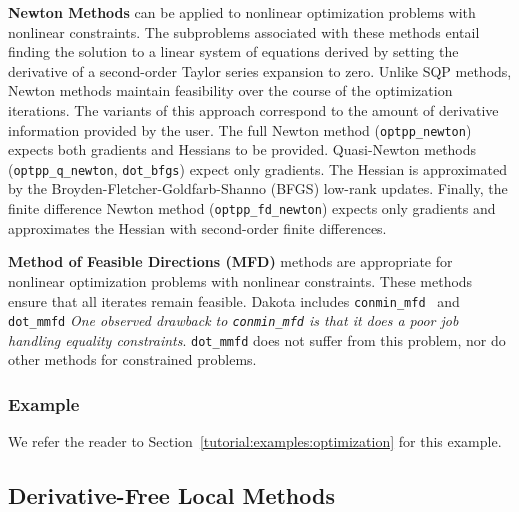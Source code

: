 {\bf Newton Methods} can be applied to nonlinear optimization problems
with nonlinear constraints.  The subproblems associated with these
methods entail finding the solution to a linear system of equations
derived by setting the derivative of a second-order Taylor series
expansion to zero.  Unlike SQP methods, Newton methods maintain
feasibility over the course of the optimization iterations.  The
variants of this approach correspond to the amount of derivative
information provided by the user.  The full Newton method
(\texttt{optpp\_newton}) expects both gradients and Hessians to be
provided.  Quasi-Newton methods (\texttt{optpp\_q\_newton},
\texttt{dot\_bfgs}) expect only gradients.  The Hessian is
approximated by the Broyden-Fletcher-Goldfarb-Shanno (BFGS) low-rank
updates.  Finally, the finite difference Newton method
(\texttt{optpp\_fd\_newton}) expects only gradients and approximates
the Hessian with second-order finite differences.

{\bf Method of Feasible Directions (MFD)} methods are appropriate for
nonlinear optimization problems with nonlinear constraints.  These
methods ensure that all iterates remain feasible.  Dakota includes
\texttt{conmin\_mfd}~\cite{Van78} and \texttt{dot\_mmfd} \emph{One
  observed drawback to \texttt{conmin\_mfd} is that it does a poor job
  handling equality constraints}. \texttt{dot\_mmfd} does not
suffer from this problem, nor do other methods for constrained
problems.

\subsubsection{Example}
\label{opt:methods:gradient:example}

We refer the reader to Section~\ref{tutorial:examples:optimization}
for this example.

\subsection{Derivative-Free Local Methods}
\label{opt:methods:gradientfree:local}

